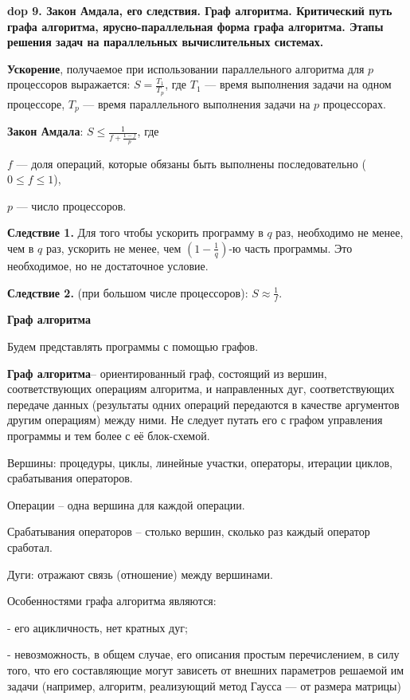 \textbf{\LARGE dop 9. Закон Амдала, его следствия. Граф алгоритма. Критический путь графа алгоритма, ярусно-параллельная форма графа алгоритма. Этапы решения задач на параллельных вычислительных системах.}


\textbf{Ускорение}, получаемое при использовании параллельного алгоритма для $p$ процессоров выражается: $S = \frac{T_1}{T_p}$, где $T_1$ --- время выполнения задачи на одном процессоре, $T_p$ --- время параллельного выполнения задачи на $p$ процессорах.

\textbf{Закон Амдала}:
$S \leqslant \frac{1}{f + \frac{1 - f}{p}}$, где

$f$ --- доля операций, которые обязаны быть выполнены последовательно ($0 \leqslant f \leqslant 1$), 

$p$ --- число процессоров.

\textbf{Следствие 1.} 
Для того чтобы ускорить программу в $q$ раз, необходимо не менее, чем в $q$ раз, ускорить не менее, чем $\left(1 - \frac{1}{q}\right)$-ю часть программы. Это необходимое, но не достаточное условие.

\textbf{Следствие 2.} (при большом числе процессоров): 
$S \approx \frac{1}{f}$.

\textbf{Граф алгоритма}

Будем представлять программы с помощью графов.

\textbf{Граф алгоритма}-- ориентированный граф, состоящий из вершин, соответствующих операциям алгоритма, и направленных дуг, соответствующих передаче данных (результаты одних операций передаются в качестве аргументов другим операциям) между ними. Не следует путать его с графом управления программы и тем более с её блок-схемой.

Вершины: процедуры, циклы, линейные участки, операторы, итерации циклов, срабатывания операторов. 

Операции -- одна вершина для каждой операции. 

Срабатывания операторов -- столько вершин, сколько раз каждый оператор сработал.

Дуги: отражают связь (отношение) между вершинами.

Особенностями графа алгоритма являются:

 - его ацикличность, нет кратных дуг;
 
 - невозможность, в общем случае, его описания простым перечислением, в силу того, что его составляющие могут зависеть от внешних параметров решаемой им задачи (например, алгоритм, реализующий метод Гаусса — от размера матрицы)

